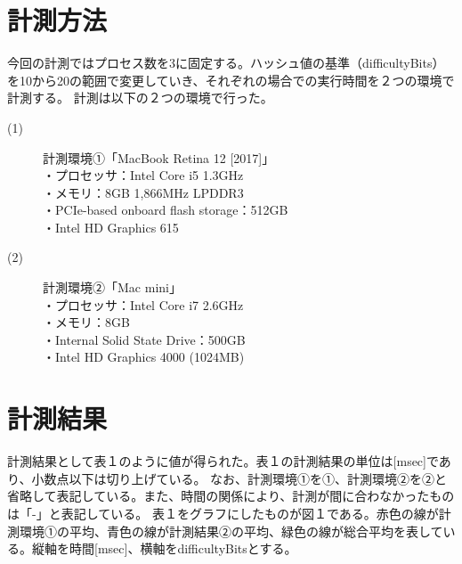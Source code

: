 \documentclass[uplatex, twocolumn, dvipdfmx, 10pt]{jsarticle}
\begin{document}
\section{計測方法}
今回の計測ではプロセス数を3に固定する。ハッシュ値の基準（difficultyBits）を10から20の範囲で変更していき、それぞれの場合での実行時間を２つの環境で計測する。
計測は以下の２つの環境で行った。
\begin{description}
  \item[(1)]計測環境①「MacBook Retina 12 [2017]」
  \\・プロセッサ：Intel Core i5 1.3GHz 
  \\・メモリ：8GB 1,866MHz LPDDR3
  \\・PCIe-based onboard flash storage：512GB
  \\・Intel HD Graphics 615
  \item[(2)]計測環境②「Mac mini」
  \\・プロセッサ：Intel Core i7 2.6GHz
  \\・メモリ：8GB
  \\・Internal Solid State Drive：500GB 
  \\・Intel HD Graphics 4000 (1024MB)
\end{description}

\section{計測結果}
計測結果として表１のように値が得られた。表１の計測結果の単位は[msec]であり、小数点以下は切り上げている。
なお、計測環境①を①、計測環境②を②と省略して表記している。また、時間の関係により、計測が間に合わなかったものは「-」と表記している。
表１をグラフにしたものが図１である。赤色の線が計測環境①の平均、青色の線が計測結果②の平均、緑色の線が総合平均を表している。縦軸を時間[msec]、横軸をdifficultyBitsとする。
\end{document}

